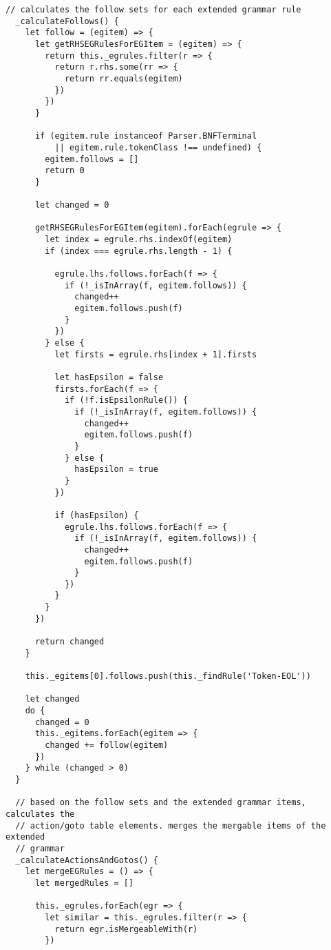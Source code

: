 \begin{lstlisting}[frame=single]
  // calculates the follow sets for each extended grammar rule
  _calculateFollows() {
    let follow = (egitem) => {
      let getRHSEGRulesForEGItem = (egitem) => {
        return this._egrules.filter(r => { 
          return r.rhs.some(rr => {
            return rr.equals(egitem) 
          })
        })
      }
      
      if (egitem.rule instanceof Parser.BNFTerminal
          || egitem.rule.tokenClass !== undefined) {
        egitem.follows = []
        return 0
      }
      
      let changed = 0
      
      getRHSEGRulesForEGItem(egitem).forEach(egrule => {
        let index = egrule.rhs.indexOf(egitem)
        if (index === egrule.rhs.length - 1) {
          
          egrule.lhs.follows.forEach(f => {
            if (!_isInArray(f, egitem.follows)) {
              changed++
              egitem.follows.push(f)
            }
          })
        } else {
          let firsts = egrule.rhs[index + 1].firsts
          
          let hasEpsilon = false
          firsts.forEach(f => {
            if (!f.isEpsilonRule()) {
              if (!_isInArray(f, egitem.follows)) {
                changed++
                egitem.follows.push(f)
              }
            } else {
              hasEpsilon = true
            }
          })
          
          if (hasEpsilon) {
            egrule.lhs.follows.forEach(f => {
              if (!_isInArray(f, egitem.follows)) {
                changed++
                egitem.follows.push(f)
              }
            })
          }
        }
      })
      
      return changed
    }
    
    this._egitems[0].follows.push(this._findRule('Token-EOL'))
    
    let changed
    do {
      changed = 0
      this._egitems.forEach(egitem => {
        changed += follow(egitem)
      })
    } while (changed > 0)
  }
  
  // based on the follow sets and the extended grammar items, calculates the
  // action/goto table elements. merges the mergable items of the extended
  // grammar
  _calculateActionsAndGotos() {
    let mergeEGRules = () => {
      let mergedRules = []
      
      this._egrules.forEach(egr => {
        let similar = this._egrules.filter(r => {
          return egr.isMergeableWith(r)
        })
        

\end{lstlisting}
